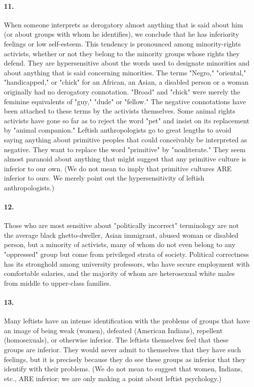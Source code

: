 \documentclass[12pt]{book}
\begin{document}
\paragraph{11.} When someone interprets as derogatory almost anything that is said about him (or about groups with whom he identifies), we conclude that he has inferiority feelings or low self-esteem. This tendency is pronounced among minority-rights activists, whether or not they belong to the minority groups whose rights they defend. They are hypersensitive about the words used to designate minorities and about anything that is said concerning minorities. The terms "Negro," "oriental," "handicapped," or "chick" for an African, an Asian, a disabled person or a woman originally had no derogatory connotation. "Broad" and "chick" were merely the feminine equivalents of "guy," "dude" or "fellow." The negative connotations have been attached to these terms by the activists themselves. Some animal rights activists have gone so far as to reject the word "pet" and insist on its replacement by "animal companion." Leftish anthropologists go to great lengths to avoid saying anything about primitive peoples that could conceivably be interpreted as negative. They want to replace the word "primitive" by "nonliterate." They seem almost paranoid about anything that might suggest that any primitive culture is inferior to our own. (We do not mean to imply that primitive cultures ARE inferior to ours. We merely point out the hypersensitivity of leftish anthropologists.)


\paragraph{12.} Those who are most sensitive about "politically incorrect" terminology are not the average black ghetto-dweller, Asian immigrant, abused woman or disabled person, but a minority of activists, many of whom do not even belong to any "oppressed" group but come from privileged strata of society. Political correctness has its stronghold among university professors, who have secure employment with comfortable salaries, and the majority of whom are heterosexual white males from middle to upper-class families.


\paragraph{13.} Many leftists have an intense identification with the problems of groups that have an image of being weak (women), defeated (American Indians), repellent (homosexuals), or otherwise inferior. The leftists themselves feel that these groups are inferior. They would never admit to themselves that they have such feelings, but it is precisely because they do see these groups as inferior that they identify with their problems. (We do not mean to suggest that women, Indians, etc., ARE inferior; we are only making a point about leftist psychology.)
\end{document}
